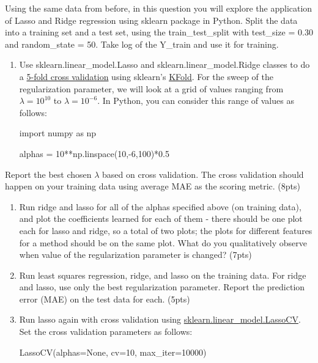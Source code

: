 \documentclass[11pt]{article}
\begin{document}
    Using the same data from before, in this question you will explore the
application of Lasso and Ridge regression using sklearn package in
Python. Split the data into a training set and a test set, using the
train\_test\_split with test\_size = 0.30 and random\_state = 50. Take
log of the Y\_train and use it for training.

    \begin{enumerate}
\def\labelenumi{\arabic{enumi})}
\item
  Use sklearn.linear\_model.Lasso and sklearn.linear\_model.Ridge
  classes to do a
  \href{http://scikit-learn.org/stable/auto_examples/exercises/plot_cv_diabetes.html\#example-exercises-plot-cv-diabetes-py}{5-fold
  cross validation} using sklearn's
  \href{http://scikit-learn.org/stable/modules/generated/sklearn.cross_validation.KFold.html}{KFold}.
  For the sweep of the regularization parameter, we will look at a grid
  of values ranging from \(\lambda = 10^{10}\) to \(\lambda = 10^{-6}\).
  In Python, you can consider this range of values as follows:

  import numpy as np

  alphas = 10**np.linspace(10,-6,100)*0.5
\end{enumerate}

Report the best chosen \(\lambda\) based on cross validation. The cross
validation should happen on your training data using average MAE as the
scoring metric. (8pts)

\begin{enumerate}
\def\labelenumi{\arabic{enumi})}
\setcounter{enumi}{1}
\item
  Run ridge and lasso for all of the alphas specified above (on training
  data), and plot the coefficients learned for each of them - there
  should be one plot each for lasso and ridge, so a total of two plots;
  the plots for different features for a method should be on the same
  plot. What do you qualitatively observe when value of the
  regularization parameter is changed? (7pts)
\item
  Run least squares regression, ridge, and lasso on the training data.
  For ridge and lasso, use only the best regularization parameter.
  Report the prediction error (MAE) on the test data for each. (5pts)
\item
  Run lasso again with cross validation using
  \href{http://scikit-learn.org/stable/modules/generated/sklearn.linear_model.LassoCV.html}{sklearn.linear\_model.LassoCV}.
  Set the cross validation parameters as follows:

  LassoCV(alphas=None, cv=10, max\_iter=10000)
\end{enumerate}
\end{document}
